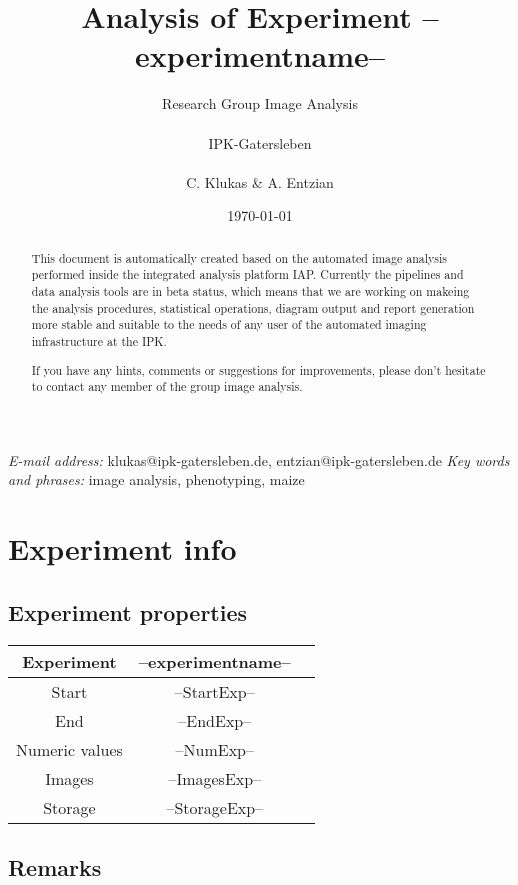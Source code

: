 \documentclass[%
  paper=a4, %
  pagesize, %
  DIV=calc, %
  headings=small,%
  english,   %
  oneside
]{scrartcl}  %
\providecommand{\tabularnewline}{\\}
\begin{document}
\title{Analysis of Experiment --experimentname--}
\author{Research Group Image Analysis\\ \\ IPK-Gatersleben\\ \\ C. Klukas \& A. Entzian}
\date{\today}

\maketitle  
\begin{abstract}
This document is automatically created based on the automated image analysis performed 
inside the integrated analysis platform IAP. Currently the pipelines and data analysis tools are in beta status, 
which means that we are working on makeing the analysis procedures, statistical operations, diagram output and report
generation more stable and suitable to the needs of any user of the automated imaging infrastructure at the IPK.

If you have any hints, comments or suggestions for improvements, please don't hesitate to contact any member
of the group image analysis.
\end{abstract}
\vfill
\small{\textit{E-mail address:} klukas@ipk-gatersleben.de, entzian@ipk-gatersleben.de}
\newline 
\small{\textit{Key words and phrases:} image analysis, phenotyping, maize }
 

\clearpage
\tableofcontents

\clearpage
\pagestyle{headings}
\section{Experiment info} 
\subsection{Experiment properties}


\begin{tabular}{|c|c|c|}
\hline 
Experiment & --experimentname--\tabularnewline
\hline 
\hline 
Start & --StartExp--\tabularnewline
\hline 
End & --EndExp--\tabularnewline
\hline 
Numeric values & --NumExp-- \tabularnewline
\hline 
Images & --ImagesExp-- \tabularnewline
\hline 
Storage & --StorageExp-- \tabularnewline
\hline 
\end{tabular}


\subsection{Remarks}
\end{document}
